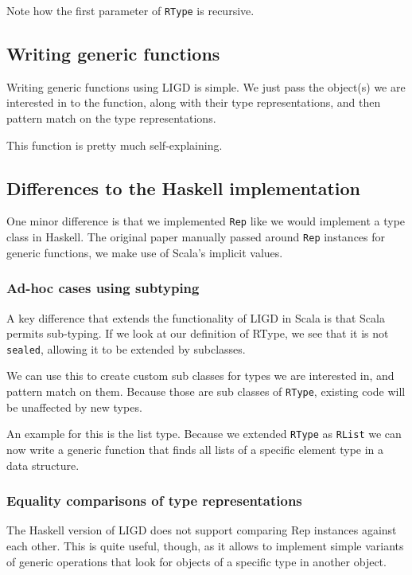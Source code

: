 \documentclass[abstracton,parskip=half]{scrreprt}
\newcommand{\cd}{\texttt}
\begin{document}
    

    Note how the first parameter of \cd{RType} is recursive.

    \subsection{Writing generic functions}
    Writing generic functions using LIGD is simple. We just pass the object(s)
    we are interested in to the function, along with their type representations,
    and then pattern match on the type representations.

      

    This function is pretty much self-explaining.

    \subsection{Differences to the Haskell implementation}
    One minor difference is that we implemented \cd{Rep} like we would implement
    a type class in Haskell. The original paper manually passed around \cd{Rep}
    instances for generic functions, we make use of Scala's implicit values.


    \subsubsection{Ad-hoc cases using subtyping}
    A key difference that extends the functionality of LIGD in Scala is that
    Scala permits sub-typing. If we look at our definition of RType, we see
    that it is not \cd{sealed}, allowing it to be extended by subclasses.

    We can use this to create custom sub classes for types we are interested
    in, and pattern match on them. Because those are sub classes of \cd{RType},
    existing code will be unaffected by new types.

    An example for this is the list type. Because we extended \cd{RType} as
    \cd{RList} we can now write a generic function that finds all lists of a
    specific element type in a data structure.

    \subsubsection{Equality comparisons of type representations}
    The Haskell version of LIGD does not support comparing Rep instances
    against each other. This is quite useful, though, as it allows to
    implement simple variants of generic operations that look for objects
    of a specific type in another object.
\end{document}
